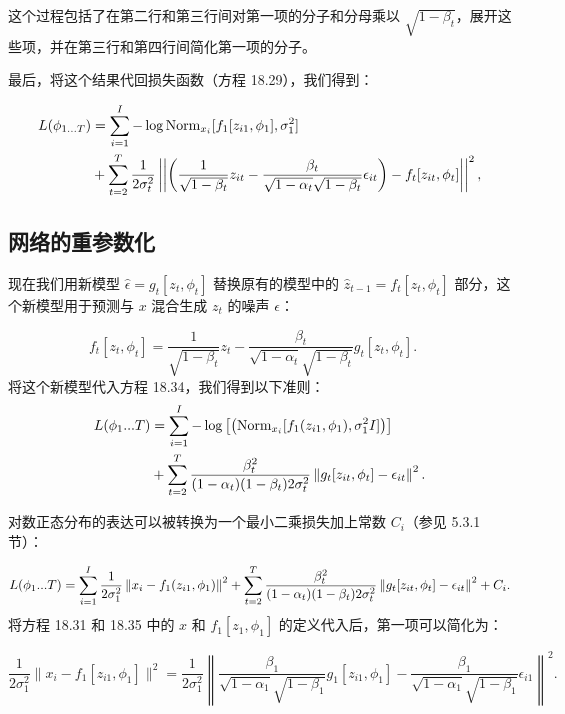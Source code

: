 \documentclass[lang=cn,newtx,10pt,scheme=chinese]{elegantbook}
\begin{document}
这个过程包括了在第二行和第三行间对第一项的分子和分母乘以 \(\sqrt{1 - \beta_t}\)，展开这些项，并在第三行和第四行间简化第一项的分子。

最后，将这个结果代回损失函数（方程 18.29），我们得到：

\begin{align}
L(\phi_{1...T}) &= \sum_{i=1}^I -\log \text{Norm}_{x_i} [f_1[z_{i1}, \phi_1], \sigma^2_{1}] \notag \\
&+ \sum_{t=2}^T \frac{1}{2\sigma^2_t} \left| \left| \left( \frac{1}{\sqrt{1 - \beta_t}}z_{it} - \frac{\beta_t}{\sqrt{1 - \alpha_t}\sqrt{1 - \beta_t}}\epsilon_{it} \right) - f_t[z_{it}, \phi_t] \right| \right|^2, 
\end{align}

\subsection{网络的重参数化}
现在我们用新模型 \(\hat{\epsilon} = g_t[z_t, \phi_t]\) 替换原有的模型中的 \(\hat{z}_{t-1} = f_t[z_t, \phi_t]\) 部分，这个新模型用于预测与 \(x\) 混合生成 \(z_t\) 的噪声 \(\epsilon\)：

\begin{equation}
f_t[z_t, \phi_t] = \frac{1}{\sqrt{1 - \beta_t}}z_t - \frac{\beta_t}{\sqrt{1 - \alpha_t}\sqrt{1 - \beta_t}}g_t[z_t, \phi_t].
\quad 
\end{equation}
将这个新模型代入方程 18.34，我们得到以下准则：
\begin{align}
L(\phi_1...T) &= \sum_{i=1}^{I} -\log \left[  \left( \text{Norm}_{x_i} [f_1(z_{i1}, \phi_1), \sigma_1^2 I] \right) \right] \notag \\
&+ \sum_{t=2}^{T} \frac{\beta_t^2}{(1 - \alpha_t)(1 - \beta_t)2\sigma_t^2} \left\| g_t[z_{it}, \phi_t] - \epsilon_{it} \right\|^2 . 
\end{align}

对数正态分布的表达可以被转换为一个最小二乘损失加上常数 \(C_i\)（参见 5.3.1 节）：

\begin{equation}
L(\phi_1...T) = \sum_{i=1}^{I} \frac{1}{2\sigma_1^2} \left\| x_i - f_1(z_{i1}, \phi_1) \right\|^2 + \sum_{t=2}^{T} \frac{\beta_t^2}{(1 - \alpha_t)(1 - \beta_t)2\sigma_t^2} \left\| g_t[z_{it}, \phi_t] - \epsilon_{it} \right\|^2 + C_i. \notag
\end{equation}
将方程 18.31 和 18.35 中的 \(x\) 和 \(f_1[z_1, \phi_1]\) 的定义代入后，第一项可以简化为：

\begin{equation}
\frac{1}{2\sigma_1^2} \|x_i - f_1[z_{i1}, \phi_1]\|^2 = \frac{1}{2\sigma_1^2} \left\| \frac{\beta_1}{\sqrt{1 - \alpha_1}\sqrt{1 - \beta_1}} g_1[z_{i1}, \phi_1] - \frac{\beta_1}{\sqrt{1 - \alpha_1}\sqrt{1 - \beta_1}} \epsilon_{i1} \right\|^2. 
\end{equation}
\end{document}
